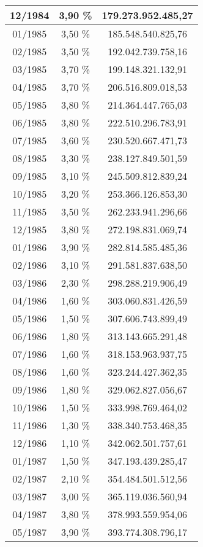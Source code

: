 \begin{center}
\begin{longtable}{|c|c|c|}
12/1984 & 3,90 \% & 179.273.952.485,27 \\ \hline
01/1985 & 3,50 \% & 185.548.540.825,76 \\ \hline
02/1985 & 3,50 \% & 192.042.739.758,16 \\ \hline
03/1985 & 3,70 \% & 199.148.321.132,91 \\ \hline
04/1985 & 3,70 \% & 206.516.809.018,53 \\ \hline
05/1985 & 3,80 \% & 214.364.447.765,03 \\ \hline
06/1985 & 3,80 \% & 222.510.296.783,91 \\ \hline
07/1985 & 3,60 \% & 230.520.667.471,73 \\ \hline
08/1985 & 3,30 \% & 238.127.849.501,59 \\ \hline
09/1985 & 3,10 \% & 245.509.812.839,24 \\ \hline
10/1985 & 3,20 \% & 253.366.126.853,30 \\ \hline
11/1985 & 3,50 \% & 262.233.941.296,66 \\ \hline
12/1985 & 3,80 \% & 272.198.831.069,74 \\ \hline
01/1986 & 3,90 \% & 282.814.585.485,36 \\ \hline
02/1986 & 3,10 \% & 291.581.837.638,50 \\ \hline
03/1986 & 2,30 \% & 298.288.219.906,49 \\ \hline
04/1986 & 1,60 \% & 303.060.831.426,59 \\ \hline
05/1986 & 1,50 \% & 307.606.743.899,49 \\ \hline
06/1986 & 1,80 \% & 313.143.665.291,48 \\ \hline
07/1986 & 1,60 \% & 318.153.963.937,75 \\ \hline
08/1986 & 1,60 \% & 323.244.427.362,35 \\ \hline
09/1986 & 1,80 \% & 329.062.827.056,67 \\ \hline
10/1986 & 1,50 \% & 333.998.769.464,02 \\ \hline
11/1986 & 1,30 \% & 338.340.753.468,35 \\ \hline
12/1986 & 1,10 \% & 342.062.501.757,61 \\ \hline
01/1987 & 1,50 \% & 347.193.439.285,47 \\ \hline
02/1987 & 2,10 \% & 354.484.501.512,56 \\ \hline
03/1987 & 3,00 \% & 365.119.036.560,94 \\ \hline
04/1987 & 3,80 \% & 378.993.559.954,06 \\ \hline
05/1987 & 3,90 \% & 393.774.308.796,17 \\ \hline

\end{longtable}
\end{center}
